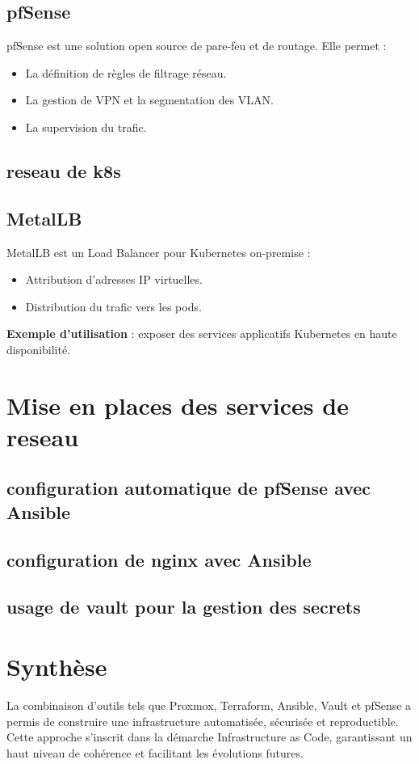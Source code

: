 \subsection{pfSense}

pfSense est une solution open source de pare-feu et de routage. Elle permet :
\begin{itemize}
	\item La définition de règles de filtrage réseau.
	\item La gestion de VPN et la segmentation des VLAN.
	\item La supervision du trafic.
\end{itemize}
\subsection{reseau de k8s}
\subsection{MetalLB}

MetalLB est un Load Balancer pour Kubernetes on-premise :
\begin{itemize}
	\item Attribution d’adresses IP virtuelles.
	\item Distribution du trafic vers les pods.
\end{itemize}

\textbf{Exemple d’utilisation} : exposer des services applicatifs Kubernetes en haute disponibilité.
\section{Mise en places des services de reseau}
\subsection{configuration automatique de pfSense avec Ansible}
\subsection{configuration de nginx avec Ansible}
\subsection{usage de vault pour la gestion des secrets}
\section{Synthèse}

La combinaison d’outils tels que Proxmox, Terraform, Ansible, Vault et pfSense a permis de construire une infrastructure automatisée, sécurisée et reproductible. Cette approche s’inscrit dans la démarche Infrastructure as Code, garantissant un haut niveau de cohérence et facilitant les évolutions futures.


